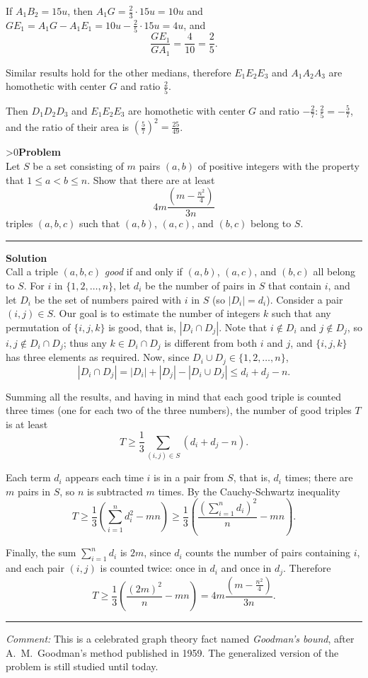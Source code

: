 \documentclass[12pt,oneside,a4paper]{book}
\newcounter{probnum}
\newcounter{solnum}
\newcommand{\prob}{\ifnum\value{probnum}>0\newpage\fi\setcounter{solnum}{0}\stepcounter{probnum}\textbf{Problem \theprobnum}\\}
\newcommand{\comment}{\medskip\hrule\medbreak\emph{Comment: }}
\newcommand{\sol}{\medskip\hrule\medbreak\textbf{Solution}\\}
\begin{document}
If $A_1B_2 = 15u$, then $A_1G = \frac23\cdot 15u = 10u$ and $GE_1 = A_1G - A_1E_1 = 10u - \frac25\cdot 15u = 4u$, and
\[\frac{GE_1}{GA_1} = \frac 4{10} = \frac25.\]

Similar results hold for the other medians, therefore $E_1E_2E_3$ and $A_1A_2A_3$ are homothetic with center $G$ and ratio $\frac25$.

Then $D_1D_2D_3$ and $E_1E_2E_3$ are homothetic with center $G$ and ratio $-\frac 27 : \frac25 = -\frac57$, and the ratio of their area is $\left(\frac 57\right)^2 = \frac{25}{49}$.

\prob Let $S$ be a set consisting of $m$ pairs $(a,b)$ of positive integers with the property that $1\le a<b\le n$. Show that there are at least
\[4m\frac{(m-\frac{n^2}4)}{3n}\]
triples $(a,b,c)$ such that $(a,b)$, $(a,c)$, and $(b,c)$ belong to $S$.

\sol
Call a triple $(a,b,c)$ \emph{good} if and only if $(a,b)$, $(a,c)$, and $(b,c)$ all belong to $S$. For $i$ in $\{1,2,\ldots,n\}$, let $d_i$ be the number of pairs in $S$ that contain $i$, and let $D_i$ be the set of numbers paired with $i$ in $S$ (so $|D_i| = d_i$). Consider a pair $(i,j)\in S$. Our goal is to estimate the number of integers $k$ such that any permutation of $\{i,j,k\}$ is good, that is, $|D_i\cap D_j|$. Note that $i\notin D_i$ and $j\notin D_j$, so $i,j\notin D_i\cap D_j$; thus any $k\in D_i\cap D_j$ is different from both $i$ and $j$, and $\{i,j,k\}$ has three elements as required. Now, since $D_i\cup D_j \in \{1,2,\ldots,n\}$,
\[|D_i\cap D_j| = |D_i| + |D_j| - |D_i\cup D_j| \le d_i + d_j - n.\]

Summing all the results, and having in mind that each good triple is counted three times (one for each two of the three numbers), the number of good triples $T$ is at least
\[T \ge \frac 13\sum_{(i,j)\in S}(d_i+d_j-n).\]

Each term $d_i$ appears each time $i$ is in a pair from $S$, that is, $d_i$ times; there are $m$ pairs in $S$, so $n$ is subtracted $m$ times. By the Cauchy-Schwartz inequality
\[T \ge \frac13\left(\sum_{i=1}^n d_i^2 - mn\right) \ge \frac13\left(\frac{\left(\sum_{i=1}^n d_i\right)^2}n - mn\right).\]

Finally, the sum $\sum_{i=1}^n d_i$ is $2m$, since $d_i$ counts the number of pairs containing $i$, and each pair $(i,j)$ is counted twice: once in $d_i$ and once in $d_j$. Therefore
\[T \ge \frac13\left(\frac{(2m)^2}n - mn\right) = 4m\frac{(m-\frac{n^2}4)}{3n}.\]

\comment
This is a celebrated graph theory fact named \emph{Goodman's bound}, after A.~M.~Goodman's method published in 1959. The generalized version of the problem is still studied until today.
\end{document}
